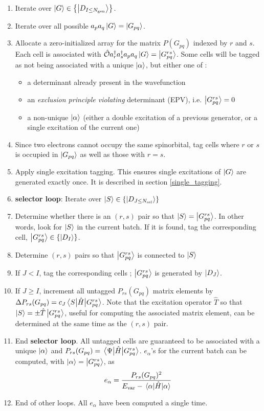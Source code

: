 \documentclass[./thesis.tex]{subfiles}
\begin{document}
\begin{enumerate}
\item
Iterate over $\ket {G} \in \left \{ \ket{D_{I \leq {N_\text{gen}}}} \right \}$.
\item
Iterate over all possible $a_p a_q \ket G = \ket {G_{pq}}$.
\item
Allocate a zero-initialized array for the matrix $P(G_{pq})$ indexed by $r$ and $s$. Each cell is associated with ${\hat{\mathcal{O}}} a^\dagger_r a^\dagger_s a_p a_q  \ket G = \ket{G^{rs}_{pq}}$. Some cells will be tagged as not being associated with a unique $\ket \alpha$, but either one of :
\begin{itemize}
\item
a determinant already present in the wavefunction
\item
an \emph{exclusion principle violating} determinant (EPV), i.e. $\ket{G^{rs}_{pq}} = 0$
\item
a non-unique $\ket \alpha$ (either a double excitation of a previous generator, or a single excitation of the current one)
\end{itemize}

\item
Since two electrons cannot occupy the same spinorbital, tag cells where $r$ or $s$ is occupied in $\ket {G_{pq}}$ as well as those with $r=s$.
\item
Apply single excitation tagging. This ensures single excitations of $\ket G$ are generated exactly once. It is described in section \ref{single_tagging}.
\item
\textbf{selector loop}: Iterate over $\ket {S} \in \left \{ \ket{D_{J \le {N_\text{sel}}}} \right \}$
\item
Determine whether there is an $(r,s)$ pair so that $\ket S = \ket {G_{pq}^{rs}}$. In other words, look for $\ket S$ in the current batch. If it is found, tag the corresponding cell, $\ket{G^{rs}_{pq}} \in \{\ket{D_I}\}$.
\item
Determine $(r,s)$ pairs so that $\ket {G_{pq}^{rs}}$ is connected to $\ket S$
\item
If $J<I$, tag the corresponding cells ; $\ket{G^{rs}_{pq}}$ is generated by $\ket{D_J}$.
\item
If $J \geq I$, increment all untagged $P_{rs}(G_{pq})$ matrix elements by $\Delta P_{rs}(G_{pq}) = c_J \mel{S}{\hat{H}}{G^{rs}_{pq}}$. Note that the excitation operator $\hat{T}$ so that $\ket S= \pm \hat{T} \ket{G^{rs}_{pq}}$, useful for computing the associated matrix element, can be determined at the same time as the $(r,s)$ pair.
\item
End \textbf{selector loop}. All untagged cells are guaranteed to be associated with a unique $\ket \alpha$ and $P_{rs}(G_{pq}) = \mel{\Psi}{\hat{H}}{G^{rs}_{pq}}$. $e_\alpha$'s for the current batch can be computed, with ${\ket{\alpha}} = \ket {G_{pq}^{rs}}$, as
\begin{equation}
e_\alpha = \frac{P_{rs}(G_{pq})^2}{E_\text{var}-\mel{\alpha}{\hat{H}}{\alpha}}
\end{equation}
\item
End of other loops. All $e_\alpha$ have been computed a single time.

\end{enumerate}
\end{document}
